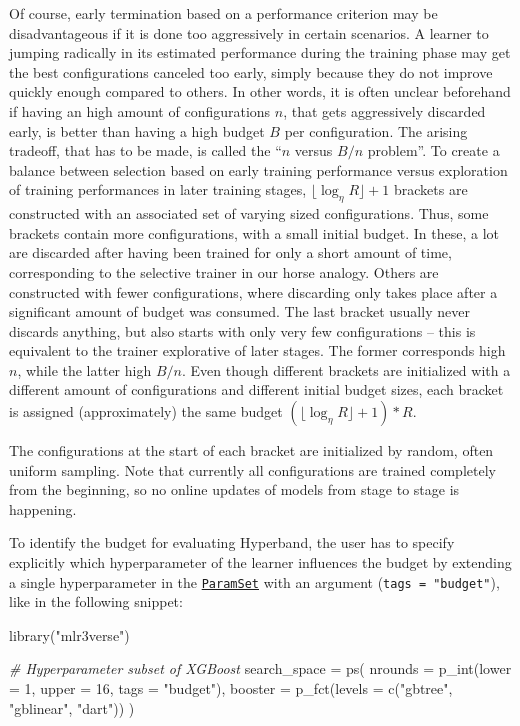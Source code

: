 \documentclass[
]{scrbook}
\newenvironment{Shaded}{\begin{snugshade}}{\end{snugshade}}
\newcommand{\AttributeTok}[1]{\textcolor[rgb]{0.77,0.63,0.00}{#1}}
\newcommand{\CommentTok}[1]{\textcolor[rgb]{0.56,0.35,0.01}{\textit{#1}}}
\newcommand{\DecValTok}[1]{\textcolor[rgb]{0.00,0.00,0.81}{#1}}
\newcommand{\FunctionTok}[1]{\textcolor[rgb]{0.00,0.00,0.00}{#1}}
\newcommand{\NormalTok}[1]{#1}
\newcommand{\OtherTok}[1]{\textcolor[rgb]{0.56,0.35,0.01}{#1}}
\newcommand{\StringTok}[1]{\textcolor[rgb]{0.31,0.60,0.02}{#1}}
\renewenvironment{Shaded} {\begin{snugshade}\small} {\end{snugshade}}
\begin{document}
Of course, early termination based on a performance criterion may be disadvantageous if it is done too aggressively in certain scenarios.
A learner to jumping radically in its estimated performance during the training phase may get the best configurations canceled too early, simply because they do not improve quickly enough compared to others.
In other words, it is often unclear beforehand if having an high amount of configurations \(n\), that gets aggressively discarded early, is better than having a high budget \(B\) per configuration.
The arising tradeoff, that has to be made, is called the ``\(n\) versus \(B/n\) problem''.
To create a balance between selection based on early training performance versus exploration of training performances in later training stages, \(\lfloor \log_{\eta}{R} \rfloor + 1\) brackets are constructed with an associated set of varying sized configurations.
Thus, some brackets contain more configurations, with a small initial budget.
In these, a lot are discarded after having been trained for only a short amount of time, corresponding to the selective trainer in our horse analogy.
Others are constructed with fewer configurations, where discarding only takes place after a significant amount of budget was consumed.
The last bracket usually never discards anything, but also starts with only very few configurations -- this is equivalent to the trainer explorative of later stages.
The former corresponds high \(n\), while the latter high \(B/n\).
Even though different brackets are initialized with a different amount of configurations and different initial budget sizes, each bracket is assigned (approximately) the same budget \((\lfloor \log_{\eta}{R} \rfloor + 1) * R\).

The configurations at the start of each bracket are initialized by random, often uniform sampling.
Note that currently all configurations are trained completely from the beginning, so no online updates of models from stage to stage is happening.

To identify the budget for evaluating Hyperband, the user has to specify explicitly which hyperparameter of the learner influences the budget by extending a single hyperparameter in the \href{https://paradox.mlr-org.com/reference/ParamSet.html}{\texttt{ParamSet}} with an argument (\texttt{tags\ =\ "budget"}), like in the following snippet:

\begin{Shaded}
\begin{Highlighting}[]
\FunctionTok{library}\NormalTok{(}\StringTok{"mlr3verse"}\NormalTok{)}

\CommentTok{\# Hyperparameter subset of XGBoost}
\NormalTok{search\_space }\OtherTok{=} \FunctionTok{ps}\NormalTok{(}
  \AttributeTok{nrounds =} \FunctionTok{p\_int}\NormalTok{(}\AttributeTok{lower =} \DecValTok{1}\NormalTok{, }\AttributeTok{upper =} \DecValTok{16}\NormalTok{, }\AttributeTok{tags =} \StringTok{"budget"}\NormalTok{),}
  \AttributeTok{booster =} \FunctionTok{p\_fct}\NormalTok{(}\AttributeTok{levels =} \FunctionTok{c}\NormalTok{(}\StringTok{"gbtree"}\NormalTok{, }\StringTok{"gblinear"}\NormalTok{, }\StringTok{"dart"}\NormalTok{))}
\NormalTok{)}
\end{Highlighting}
\end{Shaded}
\end{document}
